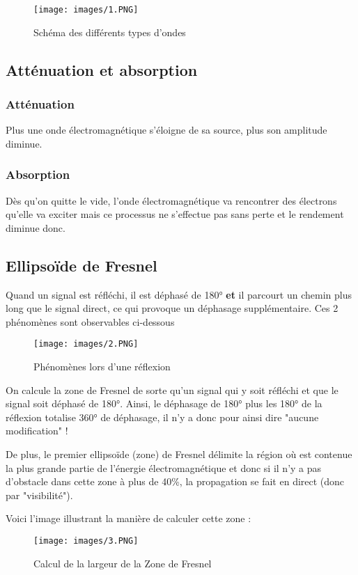 \documentclass[a4paper]{article}
\begin{document}
\begin{figure}[H]
  \centering
  \texttt{[image: images/1.PNG]}
  \caption{Schéma des différents types d'ondes}
\end{figure}

\subsection{Atténuation et absorption}
\subsubsection{Atténuation}

Plus une onde électromagnétique s'éloigne de sa source, plus son amplitude diminue.

\subsubsection{Absorption}

Dès qu'on quitte le vide, l'onde électromagnétique
va rencontrer des électrons qu'elle va exciter mais ce
processus ne s'effectue pas sans perte et le
rendement diminue donc.

\subsection{Ellipsoïde de Fresnel}
Quand un signal est réfléchi, il est déphasé de 180° \textbf{et} il parcourt un chemin plus long que le signal direct, ce qui provoque un déphasage supplémentaire. Ces 2 phénomènes sont observables ci-dessous
\begin{figure}[H]
  \centering
  \texttt{[image: images/2.PNG]}
  \caption{Phénomènes lors d'une réflexion}
\end{figure}

On calcule la zone de Fresnel de sorte qu'un signal qui y soit réfléchi et que le signal soit déphasé de 180°. 
Ainsi, le déphasage de 180° plus les 180° de la réflexion totalise 360° de déphasage, il n'y a donc pour ainsi dire "aucune modification" !

De plus, le premier ellipsoïde (zone) de Fresnel délimite la région où est
contenue la plus grande partie de l’énergie électromagnétique et donc si il n'y a pas d'obstacle dans cette zone à plus de 40\%, la propagation se fait en direct (donc par "visibilité").

Voici l'image illustrant la manière de calculer cette zone :
\begin{figure}[H]
  \centering
  \texttt{[image: images/3.PNG]}
  \caption{Calcul de la largeur de la Zone de Fresnel}
\end{figure}
\end{document}
